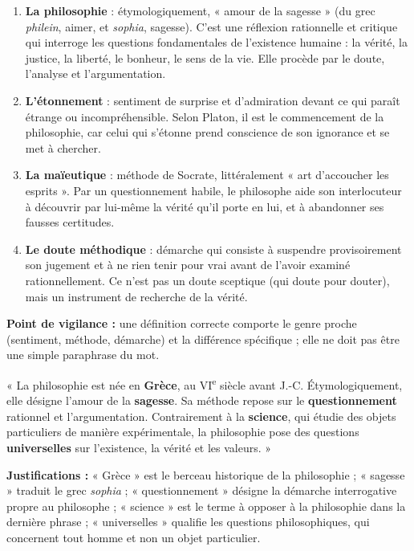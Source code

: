 \documentclass[11pt]{article}
\begin{document}
\begin{corrige}
\begin{enumerate}
\item \textbf{La philosophie} : étymologiquement, « amour de la sagesse » (du grec \emph{philein}, aimer, et \emph{sophia}, sagesse). C'est une réflexion rationnelle et critique qui interroge les questions fondamentales de l'existence humaine : la vérité, la justice, la liberté, le bonheur, le sens de la vie. Elle procède par le doute, l'analyse et l'argumentation.
\item \textbf{L'étonnement} : sentiment de surprise et d'admiration devant ce qui paraît étrange ou incompréhensible. Selon Platon, il est le commencement de la philosophie, car celui qui s'étonne prend conscience de son ignorance et se met à chercher.
\item \textbf{La maïeutique} : méthode de Socrate, littéralement « art d'accoucher les esprits ». Par un questionnement habile, le philosophe aide son interlocuteur à découvrir par lui-même la vérité qu'il porte en lui, et à abandonner ses fausses certitudes.
\item \textbf{Le doute méthodique} : démarche qui consiste à suspendre provisoirement son jugement et à ne rien tenir pour vrai avant de l'avoir examiné rationnellement. Ce n'est pas un doute sceptique (qui doute pour douter), mais un instrument de recherche de la vérité.
\end{enumerate}
\textbf{Point de vigilance :} une définition correcte comporte le genre proche (sentiment, méthode, démarche) et la différence spécifique ; elle ne doit pas être une simple paraphrase du mot.
\end{corrige}

\begin{corrige}
« La philosophie est née en \textbf{Grèce}, au VI\textsuperscript{e} siècle avant J.-C. Étymologiquement, elle désigne l'amour de la \textbf{sagesse}. Sa méthode repose sur le \textbf{questionnement} rationnel et l'argumentation. Contrairement à la \textbf{science}, qui étudie des objets particuliers de manière expérimentale, la philosophie pose des questions \textbf{universelles} sur l'existence, la vérité et les valeurs. »

\textbf{Justifications :} « Grèce » est le berceau historique de la philosophie ; « sagesse » traduit le grec \emph{sophia} ; « questionnement » désigne la démarche interrogative propre au philosophe ; « science » est le terme à opposer à la philosophie dans la dernière phrase ; « universelles » qualifie les questions philosophiques, qui concernent tout homme et non un objet particulier.
\end{corrige}
\end{document}
